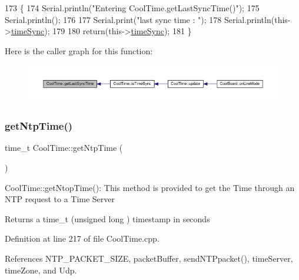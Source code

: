 \begin{DoxyCode}
173 \{
174     Serial.println(\textcolor{stringliteral}{"Entering CoolTime.getLastSyncTime()"});
175     Serial.println();
176     
177     Serial.print(\textcolor{stringliteral}{"last sync time : "});
178     Serial.println(this->\hyperlink{classCoolTime_a9d032e76c3470a15b3bbbc52af6463f7}{timeSync});
179 
180     \textcolor{keywordflow}{return}(this->\hyperlink{classCoolTime_a9d032e76c3470a15b3bbbc52af6463f7}{timeSync});
181 \}
\end{DoxyCode}
Here is the caller graph for this function\+:
\nopagebreak
\begin{figure}[H]
\begin{center}
\leavevmode
\includegraphics[width=350pt]{classCoolTime_a5d17f707a9d337720493b2bce9d41c21_icgraph}
\end{center}
\end{figure}
\mbox{\label{classCoolTime_a41fbbbfd651c2079f54d4b2911e4c705}} 
\subsubsection{\texorpdfstring{get\+Ntp\+Time()}{getNtpTime()}}
{\footnotesize\ttfamily time\+\_\+t Cool\+Time\+::get\+Ntp\+Time (\begin{DoxyParamCaption}{ }\end{DoxyParamCaption})}

Cool\+Time\+::get\+Ntop\+Time()\+: This method is provided to get the Time through an N\+TP request to a Time Server

\begin{DoxyReturn}{Returns}
a time\+\_\+t (unsigned long ) timestamp in seconds 
\end{DoxyReturn}


Definition at line 217 of file Cool\+Time.\+cpp.



References N\+T\+P\+\_\+\+P\+A\+C\+K\+E\+T\+\_\+\+S\+I\+ZE, packet\+Buffer, send\+N\+T\+Ppacket(), time\+Server, time\+Zone, and Udp.



